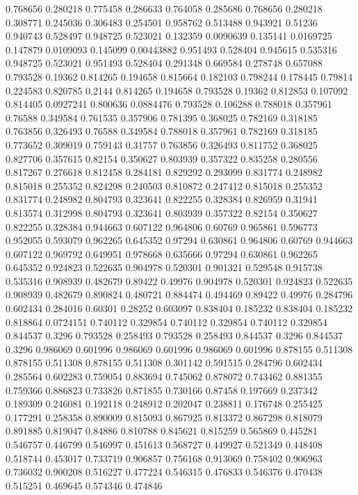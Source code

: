 0.768656 0.280218
0.775458 0.286633
0.764058 0.285686
0.768656 0.280218
0.308771 0.245036
0.306483 0.254501
0.958762 0.513488
0.943921 0.51236
0.940743 0.528497
0.948725 0.523021
0.132359 0.0090639
0.135141 0.0169725
0.147879 0.0109093
0.145099 0.00443882
0.951493 0.528404
0.945615 0.535316
0.948725 0.523021
0.951493 0.528404
0.291348 0.669584
0.278748 0.657088
0.793528 0.19362
0.814265 0.194658
0.815664 0.182103
0.798244 0.178445
0.79814 0.224583
0.820785 0.2144
0.814265 0.194658
0.793528 0.19362
0.812853 0.107092
0.814405 0.0927241
0.800636 0.0884476
0.793528 0.106288
0.788018 0.357961
0.76588 0.349584
0.761535 0.357906
0.781395 0.368025
0.782169 0.318185
0.763856 0.326493
0.76588 0.349584
0.788018 0.357961
0.782169 0.318185
0.773652 0.309019
0.759143 0.31757
0.763856 0.326493
0.811752 0.368025
0.827706 0.357615
0.82154 0.350627
0.803939 0.357322
0.835258 0.280556
0.817267 0.276618
0.812458 0.284181
0.829292 0.293099
0.831774 0.248982
0.815018 0.255352
0.824298 0.240503
0.810872 0.247412
0.815018 0.255352
0.831774 0.248982
0.804793 0.323641
0.822255 0.328384
0.826959 0.31941
0.813574 0.312998
0.804793 0.323641
0.803939 0.357322
0.82154 0.350627
0.822255 0.328384
0.944663 0.607122
0.964806 0.60769
0.965861 0.596773
0.952055 0.593079
0.962265 0.645352
0.97294 0.630861
0.964806 0.60769
0.944663 0.607122
0.969792 0.649951
0.978668 0.635666
0.97294 0.630861
0.962265 0.645352
0.924823 0.522635
0.904978 0.520301
0.901321 0.529548
0.915738 0.535316
0.908939 0.482679
0.89422 0.49976
0.904978 0.520301
0.924823 0.522635
0.908939 0.482679
0.890824 0.480721
0.884474 0.494469
0.89422 0.49976
0.284796 0.602434
0.284016 0.60301
0.28252 0.603097
0.838404 0.185232
0.838404 0.185232
0.818864 0.0724151
0.740112 0.329854
0.740112 0.329854
0.740112 0.329854
0.844537 0.3296
0.793528 0.258493
0.793528 0.258493
0.844537 0.3296
0.844537 0.3296
0.986069 0.601996
0.986069 0.601996
0.986069 0.601996
0.878155 0.511308
0.878155 0.511308
0.878155 0.511308
0.301142 0.591515
0.284796 0.602434
0.285564 0.602283
0.759054 0.883694
0.745062 0.878072
0.743462 0.881355
0.759366 0.886823
0.733826 0.871855
0.730166 0.87458
0.197669 0.237342
0.189309 0.246081
0.192118 0.248912
0.202047 0.238811
0.176748 0.255425
0.177291 0.258358
0.890009 0.815093
0.867925 0.813372
0.867298 0.818079
0.891885 0.819047
0.84886 0.810788
0.845621 0.815259
0.565869 0.445281
0.546757 0.446799
0.546997 0.451613
0.568727 0.449927
0.521349 0.448408
0.518744 0.453017
0.733719 0.906857
0.756168 0.913069
0.758402 0.906963
0.736032 0.900208
0.516227 0.477224
0.546315 0.476833
0.546376 0.470438
0.515251 0.469645
0.574346 0.474846
